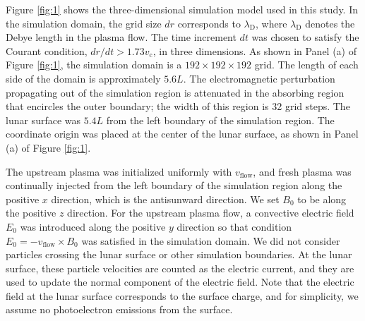 \documentclass[draft,jgrga]{agutex2015}
\begin{document}
\begin{article}
Figure \ref{fig:1} shows the three-dimensional simulation model used in this study.
In the simulation domain, 
the grid size $dr$ corresponds to $\lambda_\mathrm{D}$, 
where $\lambda_\mathrm{D}$ denotes the Debye length in the plasma flow.
The time increment $dt$ was chosen to satisfy 
the Courant condition, $dr/dt > 1.73 v_\mathrm{c}$, in three dimensions. 
As shown in Panel (a) of Figure \ref{fig:1}, 
the simulation domain is a $192 \times 192 \times 192$ grid. 
The length of each side of the domain is approximately $5.6L$. 
The electromagnetic perturbation propagating out of the simulation region
is attenuated in the absorbing region that encircles the outer boundary; the width of this region is 32 grid steps.
The lunar surface was $5.4L$ 
from the left boundary of the simulation region.
The coordinate origin was placed at the center of the lunar surface, 
as shown in Panel (a) of Figure \ref{fig:1}.

The upstream plasma was initialized uniformly with $v_\mathrm{flow}$,
and fresh plasma was continually injected from the left boundary of 
the simulation region along the positive $x$ direction,
which is the antisunward direction.
We set $B_\mathrm{0}$ to be along the positive $z$ direction.
For the upstream plasma flow, a convective electric field $E_0$ was introduced along the positive $y$ direction 
so that condition $E_\mathrm{0} = -v_\mathrm{flow} \times B_\mathrm{0}$ 
was satisfied in the simulation domain. 
We did not consider particles crossing the lunar surface or other simulation boundaries. 
At the lunar surface, these particle velocities are counted as 
the electric current, and they are used to update the normal component
of the electric field. 
Note that the electric field at the lunar surface corresponds to the surface charge,
and for simplicity, we assume no photoelectron emissions from the surface. 


\end{article}
\end{document}
